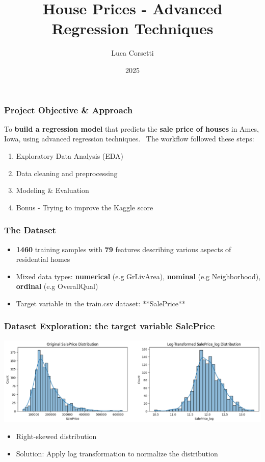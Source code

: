 \documentclass{beamer}
\title{House Prices - Advanced Regression Techniques}
\author{Luca Corsetti}
\institute{University of Bologna}
\date{2025}
\begin{document}
\frame{\titlepage}

\begin{frame}
\frametitle{Project Objective \& Approach}
To \textbf{build a regression model} that predicts the \textbf{sale price of houses} in Ames, Iowa, using advanced regression techniques.
\
The workflow followed these steps:

\begin{enumerate}
    \item Exploratory Data Analysis (EDA)
    \item Data cleaning and preprocessing
    \item Modeling \& Evaluation
    \item Bonus - Trying to improve the Kaggle score
\end{enumerate}
\end{frame}

\begin{frame}
\frametitle{The Dataset}
\begin{itemize}
    \item \textbf{1460} training samples with \textbf{79} features describing various aspects of residential homes
    \item Mixed data types: \textbf{numerical} (e.g GrLivArea), \textbf{nominal} (e.g Neighborhood), \textbf{ordinal} (e.g OverallQual)
    \item Target variable in the train.csv dataset: **SalePrice**
\end{itemize}
\end{frame}

\begin{frame}
\frametitle{Dataset Exploration: the target variable \textbf{SalePrice}}
\centering
    \includegraphics[width=1\textwidth]{../challenge/main_files/main_30_0.png}

\begin{itemize}
    \item Right-skewed distribution
    \item Solution: Apply log transformation to normalize the distribution
\end{itemize}
\end{frame}
\end{document}
